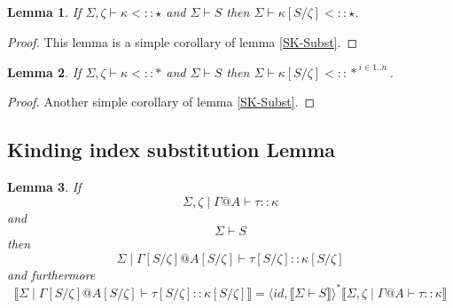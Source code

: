 \documentclass{article}
\newtheorem{lemma}{Lemma}
\newcommand{\sem}[1]{\llbracket #1 \rrbracket}
\begin{document}
\begin{lemma}
If $\Sigma,\zeta \vdash \kappa <:: \star$ and $\Sigma \vdash S$ then
$\Sigma \vdash \kappa[S/\zeta] <:: \star$.
\label{SK-Subst2}
\end{lemma}

\begin{proof}
This lemma is a simple corollary of lemma \ref{SK-Subst}.
\end{proof}


\begin{lemma}
If $\Sigma,\zeta \vdash \kappa <:: \ast$ and $\Sigma \vdash S$ then
$\Sigma \vdash \kappa[S/\zeta] <:: \ast^{~i \in 1..n}$.
\label{SK-Subst3}
\end{lemma}

\begin{proof}
Another simple corollary of lemma \ref{SK-Subst}.
\end{proof}

\subsection*{Kinding index substitution Lemma}

\begin{lemma}
If $$\Sigma,\zeta \mid \Gamma @ A \vdash \tau :: \kappa$$ and $$\Sigma \vdash S$$ then $$\Sigma \mid \Gamma[S/\zeta] @ A[S/\zeta] \vdash \tau[S/\zeta ] :: \kappa [S/\zeta ]$$ and furthermore $$\sem{\Sigma \mid \Gamma[S/\zeta] @ A[S/\zeta] \vdash \tau[S/\zeta] :: \kappa[S/\zeta]} = \langle \mathit{id}, \sem{\Sigma \vdash S} \rangle^* \sem{\Sigma,\zeta \mid \Gamma @ A \vdash \tau :: \kappa}$$
\end{lemma}
\end{document}
